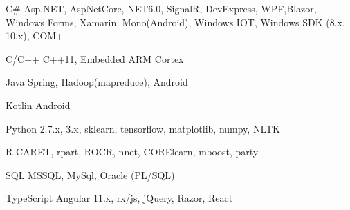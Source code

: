 

\begin{cvskills}


  \cvskill
    {C\#} %
    {Asp.NET, AspNetCore, NET6.0, SignalR, DevExpress, WPF,\newline Blazor, Windows Forms, Xamarin, Mono(Android), Windows IOT, Windows SDK (8.x, 10.x), COM+} %

\cvskill
{C/C++} %
{C++11, Embedded ARM Cortex} %

\cvskill
{Java} %
{Spring, Hadoop(mapreduce), Android} %

\cvskill
{Kotlin} %
{Android} %

\cvskill
{Python} %
{2.7.x, 3.x, sklearn, tensorflow, matplotlib, numpy, NLTK} %

\cvskill
{R} %
{CARET, rpart, ROCR, nnet, CORElearn, mboost, party} %

\cvskill
{SQL} %
{MSSQL, MySql, Oracle (PL/SQL)} %

\cvskill
{TypeScript} %
{Angular 11.x, rx/js, jQuery, Razor, React} %


\end{cvskills}
